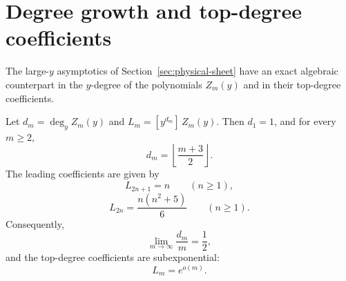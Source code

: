 \section{Degree growth and top-degree coefficients}\label{sec:support-law}

The large-\(y\) asymptotics of Section~\ref{sec:physical-sheet} have an exact algebraic counterpart in the \(y\)-degree of the polynomials \(Z_m(y)\) and in their top-degree coefficients.

\begin{theorem}\label{thm:support-law}
Let $d_m = \deg_y Z_m(y)$ and $L_m = [y^{d_m}]\,Z_m(y)$.
Then $d_1 = 1$, and for every $m \ge 2$,
\begin{equation}\label{eq:degree-formula}
d_m = \left\lfloor \frac{m+3}{2} \right\rfloor.
\end{equation}
The leading coefficients are given by
\begin{equation}\label{eq:leading-odd}
L_{2n+1} = n \qquad (n \ge 1),
\end{equation}
\begin{equation}\label{eq:leading-even}
L_{2n} = \frac{n(n^2 + 5)}{6} \qquad (n \ge 1).
\end{equation}
Consequently,
\begin{equation}\label{eq:half-filling}
\lim_{m \to \infty} \frac{d_m}{m} = \frac{1}{2},
\end{equation}
and the top-degree coefficients are subexponential:
\[
L_m = e^{o(m)}.
\]
\end{theorem}

